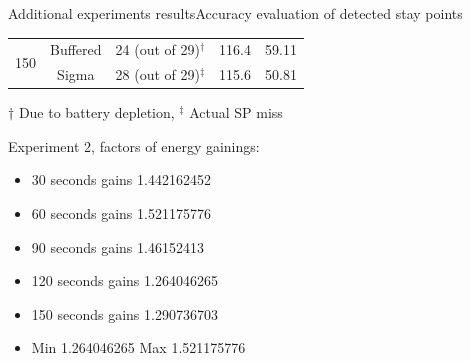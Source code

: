 \documentclass[8pt,xcolor={dvipsnames},handout]{beamer}
\begin{document}
\begin{frame}{Additional experiments results}{Accuracy evaluation of detected stay points}
\begin{table}
{\begin{tabular}{@{}ccccc@{}}
\multirow{2}{*}{150} & Buffered & 24 (out of 29)$^\dagger$ & 116.4 & 59.11 \\
 & Sigma & 28 (out of 29)$^\ddagger$ & 115.6 & 50.81 \\

\bottomrule
\end{tabular}%
}

{\scriptsize $\dagger$ Due to battery depletion, $^\ddagger$ Actual SP miss}

\end{table}
{
\scriptsize{}
Experiment 2, factors of energy gainings:
\begin{itemize}
  \item 30 seconds gains  1.442162452
  \item 60 seconds gains  1.521175776
  \item 90 seconds gains  1.46152413
  \item 120 seconds gains 1.264046265
  \item 150 seconds gains 1.290736703
  \item Min 1.264046265 Max 1.521175776
\end{itemize}
}
\end{frame}
\end{document}
